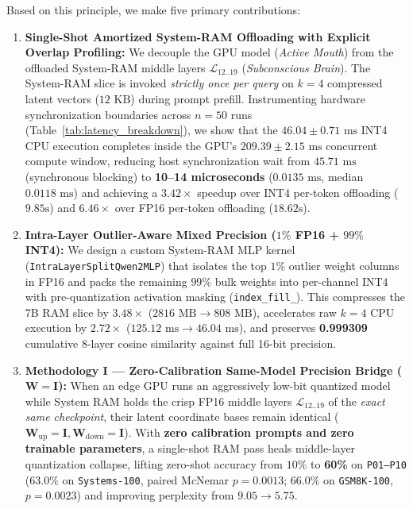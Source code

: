 \documentclass[10pt,twocolumn]{article}
\begin{document}
Based on this principle, we make five primary contributions:
\begin{enumerate}
    \item \textbf{Single-Shot Amortized System-RAM Offloading with Explicit Overlap Profiling:} We decouple the GPU model (\emph{Active Mouth}) from the offloaded System-RAM middle layers $\mathcal{L}_{12..19}$ (\emph{Subconscious Brain}). The System-RAM slice is invoked \emph{strictly once per query} on $k=4$ compressed latent vectors ($12\text{ KB}$) during prompt prefill. Instrumenting hardware synchronization boundaries across $n=50$ runs (Table~\ref{tab:latency_breakdown}), we show that the $46.04 \pm 0.71\text{ ms}$ INT4 CPU execution completes inside the GPU's $209.39 \pm 2.15\text{ ms}$ concurrent compute window, reducing host synchronization wait from $45.71\text{ ms}$ (synchronous blocking) to \textbf{10--14 microseconds} ($0.0135\text{ ms}$, median $0.0118\text{ ms}$) and achieving a $\mathbf{3.42\times}$ speedup over INT4 per-token offloading ($9.85\text{s}$) and $\mathbf{6.46\times}$ over FP16 per-token offloading ($18.62\text{s}$).
    \item \textbf{Intra-Layer Outlier-Aware Mixed Precision ($1\%$ FP16 + $99\%$ INT4):} We design a custom System-RAM MLP kernel (\texttt{IntraLayerSplitQwen2MLP}) that isolates the top $1\%$ outlier weight columns in FP16 and packs the remaining $99\%$ bulk weights into per-channel INT4 with pre-quantization activation masking (\texttt{index\_fill\_}). This compresses the 7B RAM slice by $\mathbf{3.48\times}$ ($2816\text{ MB} \to 808\text{ MB}$), accelerates raw $k=4$ CPU execution by $\mathbf{2.72\times}$ ($125.12\text{ ms} \to 46.04\text{ ms}$), and preserves \textbf{0.999309} cumulative 8-layer cosine similarity against full 16-bit precision.
    \item \textbf{Methodology I --- Zero-Calibration Same-Model Precision Bridge ($\mathbf{W} = \mathbf{I}$):} When an edge GPU runs an aggressively low-bit quantized model while System RAM holds the crisp FP16 middle layers $\mathcal{L}_{12..19}$ of the \emph{exact same checkpoint}, their latent coordinate bases remain identical ($\mathbf{W}_{\text{up}} = \mathbf{I}, \mathbf{W}_{\text{down}} = \mathbf{I}$). With \textbf{zero calibration prompts and zero trainable parameters}, a single-shot RAM pass heals middle-layer quantization collapse, lifting zero-shot accuracy from $10\%$ to \textbf{60\%} on \texttt{P01--P10} ($\mathbf{63.0\%}$ on \texttt{Systems-100}, paired McNemar $p=0.0013$; $\mathbf{66.0\%}$ on \texttt{GSM8K-100}, $p=0.0023$) and improving perplexity from $9.05 \to 5.75$.

\end{enumerate}
\end{document}
